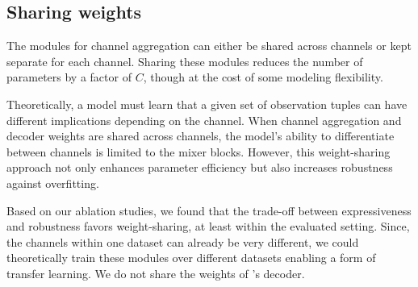 \subsection{Sharing weights}
The modules for channel aggregation can either be shared across channels or kept separate for each channel. Sharing these modules reduces the number of parameters by a factor of $C$, though at the cost of some modeling flexibility.

Theoretically, a model must learn that a given set of observation tuples can have different implications depending on the channel. When channel aggregation and decoder weights are shared across channels, the model's ability to differentiate between channels is limited to the mixer blocks. However, this weight-sharing approach not only enhances parameter efficiency but also increases robustness against overfitting.

Based on our ablation studies, we found that the trade-off between expressiveness and robustness favors weight-sharing, at least within the evaluated setting.
Since, the channels within one dataset can already be very different, we could theoretically train these modules over different datasets enabling a form of transfer learning. 
We do not share the weights of \model{}'s decoder.